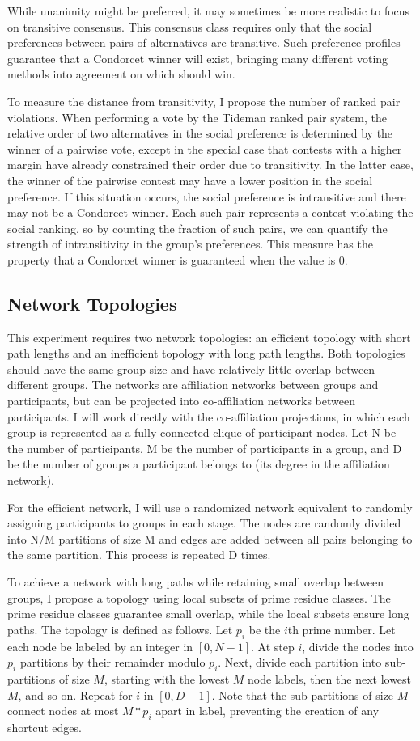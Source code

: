 While unanimity might be preferred, it may sometimes be more realistic to focus on transitive consensus. This consensus class requires only that the social preferences between pairs of alternatives are transitive. Such preference profiles guarantee that a Condorcet winner will exist, bringing many different voting methods into agreement on which should win.

To measure the distance from transitivity, I propose the number of ranked pair violations. When performing a vote by the Tideman ranked pair system, the relative order of two alternatives in the social preference is determined by the winner of a pairwise vote, except in the special case that contests with a higher margin have already constrained their order due to transitivity. In the latter case, the winner of the pairwise contest may have a lower position in the social preference. If this situation occurs, the social preference is intransitive and there may not be a Condorcet winner. Each such pair represents a contest violating the social ranking, so by counting the fraction of such pairs, we can quantify the strength of intransitivity in the group’s preferences. This measure has the property that a Condorcet winner is guaranteed when the value is 0.

\subsection{Network Topologies}
This experiment requires two network topologies: an efficient topology with short path lengths and an inefficient topology with long path lengths. Both topologies should have the same group size and have relatively little overlap between different groups. The networks are affiliation networks between groups and participants, but can be projected into co-affiliation networks between participants. I will work directly with the co-affiliation projections, in which each group is represented as a fully connected clique of participant nodes. Let N be the number of participants, M be the number of participants in a group, and D be the number of groups a participant belongs to (its degree in the affiliation network).

For the efficient network, I will use a randomized network equivalent to randomly assigning participants to groups in each stage. The nodes are randomly divided into N/M partitions of size M and edges are added between all pairs belonging to the same partition. This process is repeated D times.

To achieve a network with long paths while retaining small overlap between groups, I propose a topology using local subsets of prime residue classes. The prime residue classes guarantee small overlap, while the local subsets ensure long paths. The topology is defined as follows. Let $p_i$ be the $i$th prime number. Let each node be labeled by an integer in $[0, N-1]$. At step $i$, divide the nodes into $p_i$ partitions by their remainder modulo $p_i$. Next, divide each partition into sub-partitions of size $M$, starting with the lowest $M$ node labels, then the next lowest $M$, and so on. Repeat for $i$ in $[0, D-1]$. Note that the sub-partitions of size $M$ connect nodes at most $M*p_i$ apart in label, preventing the creation of any shortcut edges.

